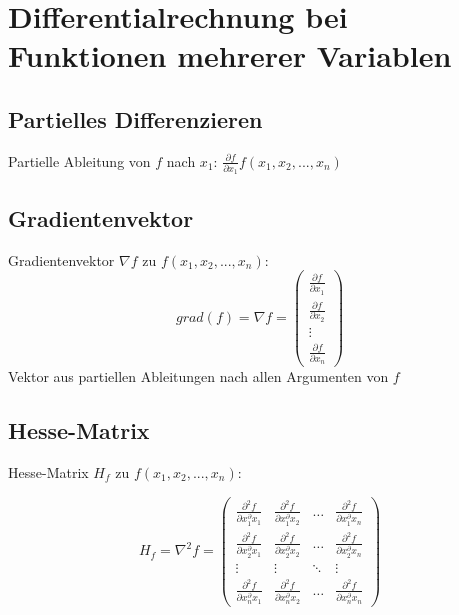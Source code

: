 \section{Differentialrechnung bei Funktionen mehrerer Variablen} %
\label{sec:differentialrechnung_bei_funktionen_mehrerer_variablen}

\subsection{Partielles Differenzieren} %
\label{sub:partielles_differenzieren}

Partielle Ableitung von $f$ nach $x_1$: $\frac{\partial f}{\partial x_1} f(x_1,x_2,...,x_n)$

\subsection{Gradientenvektor} %
\label{sub:gradientenvektor}
Gradientenvektor $\nabla f$ zu $f(x_1,x_2,...,x_n)$: 
\begin{equation}
	grad(f) = \nabla f = \left(\begin{array}{c} \frac{\partial f}{\partial x_1} \\ 
	\frac{\partial f}{\partial x_2} \\ \vdots \\ \frac{\partial f}{\partial x_n} \end{array}\right)
\end{equation}
Vektor aus partiellen Ableitungen nach allen Argumenten von $f$

\subsection{Hesse-Matrix} %
\label{sub:hesse_matrix}
Hesse-Matrix $H_f$ zu $f(x_1,x_2,...,x_n)$: 

\begin{equation}
	H_f = \nabla^2f = \left( \begin{array}{cccc}
		\frac{\partial^2 f}{\partial x_1^\partial x_1} & \frac{\partial^2 f}{\partial x_1^\partial x_2} 
		& \dots & \frac{\partial^2 f}{\partial x_1^\partial x_n} \\
		
		\frac{\partial^2 f}{\partial x_2^\partial x_1} & \frac{\partial^2 f}{\partial x_2^\partial x_2} 
		& \dots & \frac{\partial^2 f}{\partial x_2^\partial x_n} \\	
		\vdots & \vdots & \ddots & \vdots \\
		\frac{\partial^2 f}{\partial x_n^\partial x_1} & \frac{\partial^2 f}{\partial x_n^\partial x_2} 
		& \dots & \frac{\partial^2 f}{\partial x_n^\partial x_n}
	\end{array}\right)
\end{equation}


